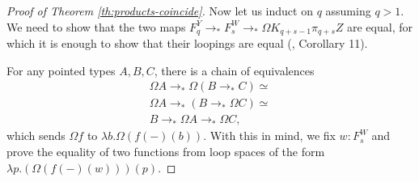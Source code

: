 \documentclass{amsart}
\theoremstyle{definition}
\newcommand{\pto}{\to_*}
\begin{document}
\begin{proof}[Proof of Theorem \ref{th:products-coincide}]
    Now let us induct on $q$ assuming $q>1$.
    We need to show that the two maps $F^Y_q \pto F^W_s \pto \Omega K_{q+s-1}\pi_{q+s}Z$ are equal, for which it is enough to show that their loopings are equal (\cite{Warn}, Corollary 11).

    For any pointed types $A, B, C$, there is a chain of equivalences
    \begin{align*}
    \Omega A \pto \Omega (B \pto C) \simeq  \\
    \Omega A \pto (B \pto \Omega C) \simeq  \\
    B \pto \Omega A \pto \Omega C,
    \end{align*}
    which sends $\Omega f$ to $\lambda b.\Omega(f(-)(b))$. With this in mind, we fix $w: F_s^W$ and prove the equality of two functions from loop spaces of the form $\lambda p.(\Omega (f(-)(w)))(p)$.


\end{proof}
\end{document}
